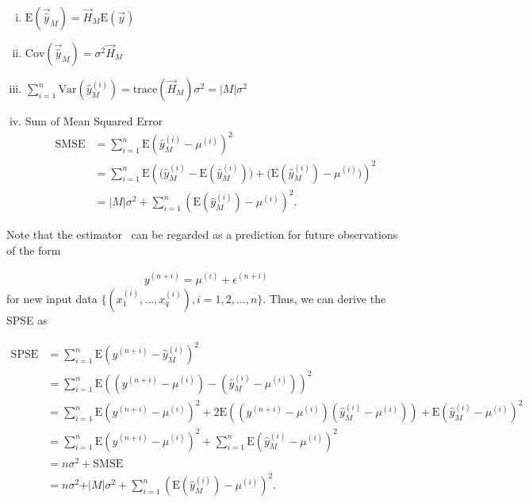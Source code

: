 \begin{enumerate}[(i)]%
	\item $\text{E} (\vec{\hat{y}}_M) = \vec{H}_M \text{E}(\vec{y})$ 
	\item $\text{Cov} (\vec{\hat{y}}_M) = \sigma^2 \vec{H}_M$
	\item $\sum_{i=1}^n \text{Var}(\hat y^{(i)}_M) =  \text{trace}(\vec{H}_M) \sigma^2 = \vert M \vert \sigma^2 $
	\item Sum of Mean Squared Error
		\begin{equation}  
		\begin{split} 
		\text{SMSE} &= \sum_{i=1}^n \text{E}\left(\hat y^{(i)}_M - \mu^{(i)}\right)^2 \\
				    &= \sum_{i=1}^n \text{E}\left( \big( \hat y^{(i)}_M - \text{E}(\hat y^{(i)}_M) \big) + \big(\text{E}(\hat y^{(i)}_M) - \mu^{(i)} \big) \right)^2 \\
				    &= \vert M \vert\sigma^2 + \sum_{i=1}^n \left( \text{E}(\hat y^{(i)}_M) - \mu^{(i)} \right)^2.
		\end{split}
		\end{equation}
\end{enumerate}

Note that the estimator~ can be regarded as a prediction for future observations of the form

\begin{align}
	y^{(n+i)} = \mu^{(i)} + \epsilon^{(n+i)}
\end{align}
%
for new input data $\{(x_1^{(i)}, \dots, x_q^{(i)}), i=1,2,\dots,n\}$. Thus, we can derive the SPSE as

\begin{equation}
\begin{split}
	\text{SPSE} &= \sum_{i=1}^{n} \text{E}\left(y^{(n+i)} - \hat y^{(i)}_M\right)^2 \\ 
				&= \sum_{i=1}^{n} \text{E}\left((y^{(n+i)} - \mu^{(i)}) - (\hat y^{(i)}_M - \mu^{(i)})\right)^2 \\ 
				&= \sum_{i=1}^{n} \text{E}\left(y^{(n+i)} - \mu^{(i)}\right)^2 + 2\text{E} \left( (y^{(n+i)} - \mu^{(i)})(\hat y^{(i)}_M - \mu^{(i)}) \right) + \text{E}\left(\hat y^{(i)}_M - \mu^{(i)}\right)^2 \\
				&= \sum_{i=1}^{n}\text{E}\left(y^{(n+i)} - \mu^{(i)}\right)^2 + \sum_{i=1}^{n} \text{E}\left( \hat y^{(i)}_M - \mu^{(i)} \right)^2 \\ 
				&= n\sigma^2 + \text{SMSE} \\ 
				&= n\sigma^2 + \vert M \vert \sigma^2 + \sum_{i=1}^{n} \left(\text{E}(\hat y^{(i)}_M) - \mu^{(i)} \right)^2.
\end{split}
\end{equation}


